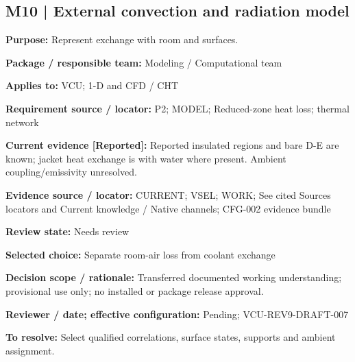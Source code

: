 \documentclass[11pt]{article}
\begin{document}
\par\noindent\begin{minipage}{\textwidth}\small\setlength{\parskip}{2pt}
\subsection*{M10 | External convection and radiation model}
\textbf{Purpose:} Represent exchange with room and surfaces.\par
\textbf{Package / responsible team:} Modeling / Computational team\par
\textbf{Applies to:} VCU; 1-D and CFD / CHT\par
\textbf{Requirement source / locator:} P2; MODEL; Reduced-zone heat loss; thermal network\par
\textbf{Current evidence [Reported]:} Reported insulated regions and bare D-E are known; jacket heat exchange is with water where present. Ambient coupling/emissivity unresolved.\par
\textbf{Evidence source / locator:} CURRENT; VSEL; WORK; See cited Sources locators and Current knowledge / Native channels; CFG-002 evidence bundle\par
\textbf{Review state:} Needs review\par
\textbf{Selected choice:} Separate room-air loss from coolant exchange\par
\textbf{Decision scope / rationale:} Transferred documented working understanding; provisional use only; no installed or package release approval.\par
\textbf{Reviewer / date; effective configuration:} Pending; VCU-REV9-DRAFT-007\par
\textbf{To resolve:} Select qualified correlations, surface states, supports and ambient assignment.\par
\end{minipage}\par\vspace{5pt}
\end{document}
